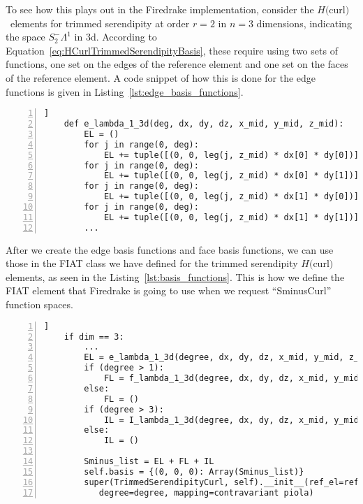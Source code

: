 \documentclass[manuscript,screen]{acmart}
\newcommand{\hcurl}{$H($curl$)$}
\begin{document}
To see how this plays out in the Firedrake implementation, consider the \hcurl~elements for trimmed serendipity at order $r=2$ in $n=3$ dimensions, indicating the space $S_2^- \Lambda^1$ in 3d. According to Equation~\ref{eq:HCurlTrimmedSerendipityBasis}, these require using two sets of functions, one set on the edges of the reference element and one set on the faces of the reference element.  A code snippet of how this is done for the edge functions is given in Listing~\ref{lst:edge_basis_functions}.
 
 \lstset{language=Python}
 \begin{lstlisting}[frame=single, caption={Portion of edge basis function implementation.}, label={lst:edge_basis_functions}, numbers=left, firstnumber=1, xleftmargin=20pt, xrightmargin=20pt]]
    def e_lambda_1_3d(deg, dx, dy, dz, x_mid, y_mid, z_mid):
        EL = ()
        for j in range(0, deg):
            EL += tuple([(0, 0, leg(j, z_mid) * dx[0] * dy[0])])
        for j in range(0, deg):
            EL += tuple([(0, 0, leg(j, z_mid) * dx[0] * dy[1])])
        for j in range(0, deg):
            EL += tuple([(0, 0, leg(j, z_mid) * dx[1] * dy[0])])
        for j in range(0, deg):
            EL += tuple([(0, 0, leg(j, z_mid) * dx[1] * dy[1])])
        ...
 \end{lstlisting}
 
 After we create the edge basis functions and face basis functions, we can use those in the FIAT class we have defined for the trimmed serendipity $H($curl$)$ elements, as seen in the Listing~\ref{lst:basis_functions}.  This is how we define the FIAT element that Firedrake is going to use when we request ``SminusCurl'' function spaces.
 
\lstset{language=Python}
 \begin{lstlisting}[frame=single, caption={Collecting the basis functions for the trimmed serendipity class inside FIAT.}, label={lst:basis_functions}, numbers=left, firstnumber=1, xleftmargin=20pt, xrightmargin=20pt]] 
    if dim == 3:
        ...
        EL = e_lambda_1_3d(degree, dx, dy, dz, x_mid, y_mid, z_mid)
        if (degree > 1):
            FL = f_lambda_1_3d(degree, dx, dy, dz, x_mid, y_mid, z_mid)
        else:
            FL = ()
        if (degree > 3):
            IL = I_lambda_1_3d(degree, dx, dy, dz, x_mid, y_mid, z_mid)
        else:
            IL = ()
    
        Sminus_list = EL + FL + IL
        self.basis = {(0, 0, 0): Array(Sminus_list)}
        super(TrimmedSerendipityCurl, self).__init__(ref_el=ref_el, 
           degree=degree, mapping=contravariant piola)
\end{lstlisting}
\end{document}
